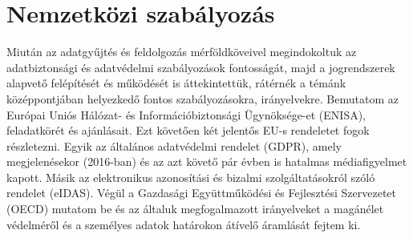 \chapter{Nemzetközi szabályozás}

Miután az adatgyűjtés és feldolgozás mérföldköveivel megindokoltuk az adatbiztonsági és adatvédelmi szabályozások fontosságát, majd a jogrendszerek alapvető felépítését és működését is áttekintettük, rátérnék a témánk középpontjában helyezkedő fontos szabályozásokra, irányelvekre. Bemutatom az Európai Uniós Hálózat- és Információbiztonsági Ügynöksége-et (ENISA), feladatkörét és ajánlásait. Ezt követően két jelentős EU-s rendeletet fogok részletezni. Egyik az általános adatvédelmi rendelet (GDPR), amely megjelenésekor (2016-ban) és az azt követő pár évben is hatalmas médiafigyelmet kapott. Másik az elektronikus azonosítási és bizalmi szolgáltatásokról szóló rendelet (eIDAS). Végül a Gazdasági Együttműködési és Fejlesztési Szervezetet (OECD) mutatom be és az általuk megfogalmazott irányelveket a magánélet védelméről és a személyes adatok határokon átívelő áramlását fejtem ki.





